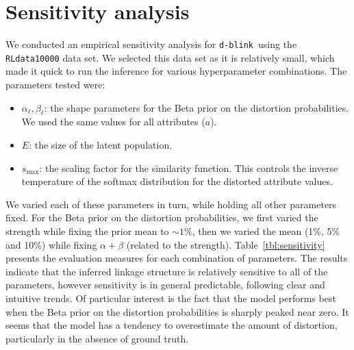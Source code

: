 \documentclass[12pt,letterpaper]{article}
\newcommand{\1}[1]{\mathbb{I}\!\left[#1\right]} %
\newcommand{\dblink}{\texttt{\upshape \lowercase{d-blink}}} %
\begin{document}
\section{Sensitivity analysis}
\label{app-sec:sensitivity}
We conducted an empirical sensitivity analysis for \dblink\ 
using the \texttt{RLdata10000} data set.
We selected this data set as it is relatively small, which made it 
quick to run the inference for various hyperparameter combinations.
The parameters tested were:
\begin{itemize}
  \item $\alpha_\ell, \beta_\ell$: the shape parameters for the Beta prior on 
  the distortion probabilities. 
  We used the same values for all attributes ($a$). 
  \item $E$: the size of the latent population.
  \item $s_{\mathrm{max}}$: the scaling factor for the similarity function. 
  This controls the inverse temperature of the softmax distribution for the 
  distorted attribute values. 
\end{itemize}
We varied each of these parameters in turn, while holding all other parameters 
fixed.
For the Beta prior on the distortion probabilities, we first varied the 
strength while fixing the prior mean to $\sim 1\%$, then we varied the mean 
(1\%, 5\% and 10\%) while fixing $\alpha + \beta$ (related to the strength). 
Table~\ref{tbl:sensitivity} presents the evaluation measures for each 
combination of parameters.
The results indicate that the inferred linkage structure is relatively 
sensitive to all of the parameters, however sensitivity is in general 
predictable, following clear and intuitive trends.
Of particular interest is the fact that the model performs best when the 
Beta prior on the distortion probabilities is sharply peaked near zero. 
It seems that the model has a tendency to overestimate the amount of 
distortion, particularly in the absence of ground truth.
\end{document}

